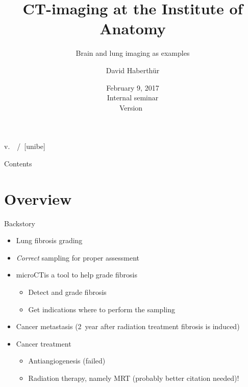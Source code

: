 \documentclass[18pt,caption=numbered]{beamer}
\subtitle{Brain and lung imaging as examples}
\author[DH]{David Haberthür}
\institute{Institute of Anatomy\\Universität Bern}
\date{February 9, 2017\\Internal seminar\\Version~\gitAbbrevHash}
\newcommand{\uct}{\si{micro}CT}
\begin{document}
\title[\si{\micro}CT imaging at ana.unibe.ch]{\si{\micro}CT-imaging at the Institute of Anatomy} %

{%
	\hspace*{\fill}%
	\insertauthor%
	\hspace*{\fill}%
	\insertshorttitle%
	\hspace*{\fill}%
	v.~\gitAbbrevHash%
	\hspace*{\fill}%
	\insertpagenumber\,/\,\insertpresentationendpage%
	\hspace*{\fill}%
	\vskip2pt%
}
[unibe]

{
\begin{frame}
  \titlepage
\end{frame}
}
\addtocounter{framenumber}{1}

\begin{frame}{Contents}
	\tableofcontents
\end{frame}

\section{Overview}
\begin{frame}{Backstory}
    \begin{itemize}
        \item Lung fibrosis grading \cite{Ashcroft1988a}
        \item \emph{Correct} sampling for proper assessment
        \item \uct is a tool to help grade fibrosis
        \begin{itemize}
            \item Detect and grade fibrosis
            \item Get indications where to perform the sampling
        \end{itemize}
        \item Cancer metastasis (\SI{2}{year} after radiation treatment fibrosis is induced)
        \item Cancer treatment
        \begin{itemize}
            \item Antiangiogenesis (failed)
            \item Radiation therapy, namely MRT \cite{Bronnimann2016} (probably better citation needed)!
        \end{itemize}
    \end{itemize}
\end{frame}
\end{document}
